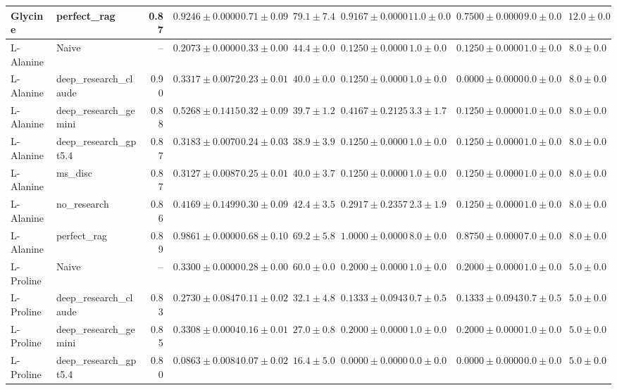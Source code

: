 \begin{table}[htbp]
\begin{tabular}{llrrrrrrrrr}
Glycine & perfect_rag & 0.87 & \cellcolor{green!25}$0.9246 \pm 0.0000$ & $0.71 \pm 0.09$ & $79.1 \pm 7.4$ & $0.9167 \pm 0.0000$ & $11.0 \pm 0.0$ & $0.7500 \pm 0.0000$ & $9.0 \pm 0.0$ & $12.0 \pm 0.0$ \\
\midrule
L-Alanine & Naive & -- & \cellcolor{red!25}$0.2073 \pm 0.0000$ & $0.33 \pm 0.00$ & $44.4 \pm 0.0$ & $0.1250 \pm 0.0000$ & $1.0 \pm 0.0$ & $0.1250 \pm 0.0000$ & $1.0 \pm 0.0$ & $8.0 \pm 0.0$ \\
L-Alanine & deep_research_claude & 0.90 & $0.3317 \pm 0.0072$ & $0.23 \pm 0.01$ & $40.0 \pm 0.0$ & $0.1250 \pm 0.0000$ & $1.0 \pm 0.0$ & $0.0000 \pm 0.0000$ & $0.0 \pm 0.0$ & $8.0 \pm 0.0$ \\
L-Alanine & deep_research_gemini & 0.88 & $0.5268 \pm 0.1415$ & $0.32 \pm 0.09$ & $39.7 \pm 1.2$ & $0.4167 \pm 0.2125$ & $3.3 \pm 1.7$ & $0.1250 \pm 0.0000$ & $1.0 \pm 0.0$ & $8.0 \pm 0.0$ \\
L-Alanine & deep_research_gpt5.4 & 0.87 & $0.3183 \pm 0.0070$ & $0.24 \pm 0.03$ & $38.9 \pm 3.9$ & $0.1250 \pm 0.0000$ & $1.0 \pm 0.0$ & $0.1250 \pm 0.0000$ & $1.0 \pm 0.0$ & $8.0 \pm 0.0$ \\
L-Alanine & ms_disc & 0.87 & $0.3127 \pm 0.0087$ & $0.25 \pm 0.01$ & $40.0 \pm 3.7$ & $0.1250 \pm 0.0000$ & $1.0 \pm 0.0$ & $0.1250 \pm 0.0000$ & $1.0 \pm 0.0$ & $8.0 \pm 0.0$ \\
L-Alanine & no_research & 0.86 & $0.4169 \pm 0.1499$ & $0.30 \pm 0.09$ & $42.4 \pm 3.5$ & $0.2917 \pm 0.2357$ & $2.3 \pm 1.9$ & $0.1250 \pm 0.0000$ & $1.0 \pm 0.0$ & $8.0 \pm 0.0$ \\
L-Alanine & perfect_rag & 0.89 & \cellcolor{green!25}$0.9861 \pm 0.0000$ & $0.68 \pm 0.10$ & $69.2 \pm 5.8$ & $1.0000 \pm 0.0000$ & $8.0 \pm 0.0$ & $0.8750 \pm 0.0000$ & $7.0 \pm 0.0$ & $8.0 \pm 0.0$ \\
\midrule
L-Proline & Naive & -- & $0.3300 \pm 0.0000$ & $0.28 \pm 0.00$ & $60.0 \pm 0.0$ & $0.2000 \pm 0.0000$ & $1.0 \pm 0.0$ & $0.2000 \pm 0.0000$ & $1.0 \pm 0.0$ & $5.0 \pm 0.0$ \\
L-Proline & deep_research_claude & 0.83 & $0.2730 \pm 0.0847$ & $0.11 \pm 0.02$ & $32.1 \pm 4.8$ & $0.1333 \pm 0.0943$ & $0.7 \pm 0.5$ & $0.1333 \pm 0.0943$ & $0.7 \pm 0.5$ & $5.0 \pm 0.0$ \\
L-Proline & deep_research_gemini & 0.85 & $0.3308 \pm 0.0004$ & $0.16 \pm 0.01$ & $27.0 \pm 0.8$ & $0.2000 \pm 0.0000$ & $1.0 \pm 0.0$ & $0.2000 \pm 0.0000$ & $1.0 \pm 0.0$ & $5.0 \pm 0.0$ \\
L-Proline & deep_research_gpt5.4 & 0.80 & \cellcolor{red!25}$0.0863 \pm 0.0084$ & $0.07 \pm 0.02$ & $16.4 \pm 5.0$ & $0.0000 \pm 0.0000$ & $0.0 \pm 0.0$ & $0.0000 \pm 0.0000$ & $0.0 \pm 0.0$ & $5.0 \pm 0.0$ \\

\end{tabular}
\end{table}
